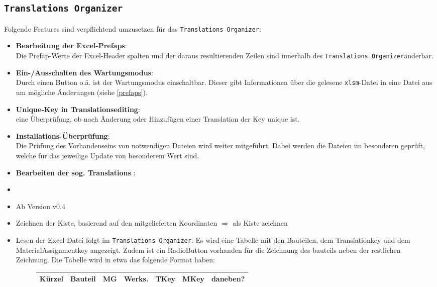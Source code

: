 \documentclass[a4paper,12pt]{article}
\newcommand{\assisttool}{\texttt{Translations Organizer}}
\begin{document}
		\subsection{\assisttool} \label{Pflichten-Nehmer-assist}
			Folgende Features sind verpflichtend umzusetzen für das \assisttool:
			\begin{itemize}
				\item \textbf{Bearbeitung der Excel-Prefaps}: \label{prefaps}\\
					Die Prefap-Werte der Excel-Header spalten und der daraus resultierenden Zeilen sind innerhalb des \assisttool änderbar.
				\item \textbf{Ein-/Ausschalten des Wartungsmodus}: \label{wartungsmodus}\\
					Durch einen Button o.ä. ist der Wartungsmodus einschaltbar. Dieser gibt Informationen über die gelesene \texttt{xlsm}-Datei in eine Datei aus um mögliche Änderungen (siehe \ref{prefaps}).
				\item \textbf{Unique-Key in Translationsediting}: \label{unique key}\\
					eine Überprüfung, ob nach Änderung oder Hinzufügen einer Translation der Key \glqq unique \grqq ist.
				\item \textbf{Installations-Überprüfung}: \label{installations ueberpruefung}\\
					Die Prüfung des Vorhandenseins von notwendigen Dateien wird weiter mitgeführt. Dabei werden die Dateien im besonderen geprüft, welche für das jeweilige Update von besonderem Wert sind.
				\item \textbf{Bearbeiten der sog. \glqq Translations \grqq}: \label{translations}
				\item[]
				\item[] Ab Version v0.4
				\item Zeichnen der Kiste, basierend auf den mitgelieferten Koordinaten $\Rightarrow$ als Kiste zeichnen
				\item Lesen der Excel-Datei folgt im \assisttool. Es wird eine Tabelle mit den Bauteilen, dem Translationkey und dem MaterialAssignmentkey angezeigt. Zudem ist ein RadioButton vorhanden für die Zeichnung des bauteils neben der restlichen Zeichnung. Die Tabelle wird in etwa das folgende Format haben:
					\begin{figure}[H]
						\centering
						\begin{tabular}{|c|c|c|c|c|c|c|}
							\hline
							Kürzel & Bauteil & MG & Werks. & TKey & MKey & daneben? \\ \hline

\end{tabular}
\end{figure}
\end{itemize}
\end{document}
